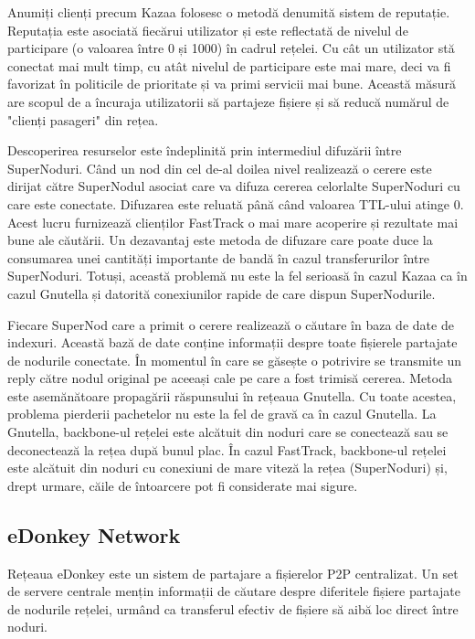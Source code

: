 Anumiți clienți precum Kazaa folosesc o metodă denumită sistem de reputație.
Reputația este asociată fiecărui utilizator și este reflectată de nivelul de
participare (o valoarea între 0 și 1000) în cadrul rețelei. Cu cât un
utilizator stă conectat mai mult timp, cu atât nivelul de participare este mai
mare, deci va fi favorizat în politicile de prioritate și va primi servicii
mai bune. Această măsură are scopul de a încuraja utilizatorii să partajeze
fișiere și să reducă numărul de "clienți pasageri" din rețea.

Descoperirea resurselor este îndeplinită prin intermediul difuzării între
SuperNoduri. Când un nod din cel de-al doilea nivel realizează o cerere este
dirijat către SuperNodul asociat care va difuza cererea celorlalte SuperNoduri
cu care este conectate. Difuzarea este reluată până când valoarea TTL-ului
atinge 0. Acest lucru furnizează clienților FastTrack o mai mare acoperire și
rezultate mai bune ale căutării. Un dezavantaj este metoda de difuzare care
poate duce la consumarea unei cantități importante de bandă în cazul
transferurilor între SuperNoduri. Totuși, această problemă nu este la fel
serioasă în cazul Kazaa ca în cazul Gnutella și datorită conexiunilor rapide
de care dispun SuperNodurile.

Fiecare SuperNod care a primit o cerere realizează o căutare în baza de date
de indexuri. Această bază de date conține informații despre toate fișierele
partajate de nodurile conectate. În momentul în care se găsește o potrivire se
transmite un reply către nodul original pe aceeași cale pe care a fost trimisă
cererea. Metoda este asemănătoare propagării răspunsului în rețeaua Gnutella.
Cu toate acestea, problema pierderii pachetelor nu este la fel de gravă ca în
cazul Gnutella. La Gnutella, backbone-ul rețelei este alcătuit din noduri care
se conectează sau se deconectează la rețea după bunul plac. În cazul
FastTrack, backbone-ul rețelei este alcătuit din noduri cu conexiuni de mare
viteză la rețea (SuperNoduri) și, drept urmare, căile de întoarcere pot fi
considerate mai sigure.

\subsection{eDonkey Network}

Rețeaua eDonkey este un sistem de partajare a fișierelor P2P centralizat. Un
set de servere centrale mențin informații de căutare despre diferitele fișiere
partajate de nodurile rețelei, urmând ca transferul efectiv de fișiere să aibă
loc direct între noduri.

